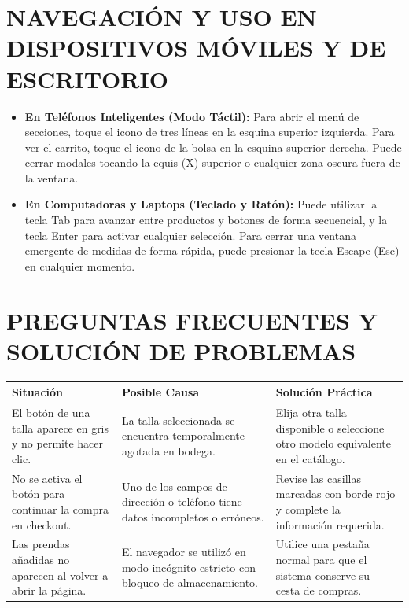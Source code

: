 \documentclass[12pt]{article}
\begin{document}
\section*{NAVEGACIÓN Y USO EN DISPOSITIVOS MÓVILES Y DE ESCRITORIO}
\begin{itemize}
    \item \textbf{En Teléfonos Inteligentes (Modo Táctil):} Para abrir el menú de secciones, toque el icono de tres líneas en la esquina superior izquierda. Para ver el carrito, toque el icono de la bolsa en la esquina superior derecha. Puede cerrar modales tocando la equis (X) superior o cualquier zona oscura fuera de la ventana.
    \item \textbf{En Computadoras y Laptops (Teclado y Ratón):} Puede utilizar la tecla Tab para avanzar entre productos y botones de forma secuencial, y la tecla Enter para activar cualquier selección. Para cerrar una ventana emergente de medidas de forma rápida, puede presionar la tecla Escape (Esc) en cualquier momento.
\end{itemize}

\section*{PREGUNTAS FRECUENTES Y SOLUCIÓN DE PROBLEMAS}

\begin{table}[H]
\centering
\small
\renewcommand{\arraystretch}{1.3}
\begin{tabularx}{\textwidth}{|p{}|p{}|X|}
\hline
\textbf{Situación} & \textbf{Posible Causa} & \textbf{Solución Práctica} \\ \hline
El botón de una talla aparece en gris y no permite hacer clic. & La talla seleccionada se encuentra temporalmente agotada en bodega. & Elija otra talla disponible o seleccione otro modelo equivalente en el catálogo. \\ \hline
No se activa el botón para continuar la compra en checkout. & Uno de los campos de dirección o teléfono tiene datos incompletos o erróneos. & Revise las casillas marcadas con borde rojo y complete la información requerida. \\ \hline
Las prendas añadidas no aparecen al volver a abrir la página. & El navegador se utilizó en modo incógnito estricto con bloqueo de almacenamiento. & Utilice una pestaña normal para que el sistema conserve su cesta de compras. \\ \hline
\end{tabularx}
\end{table}
\end{document}
